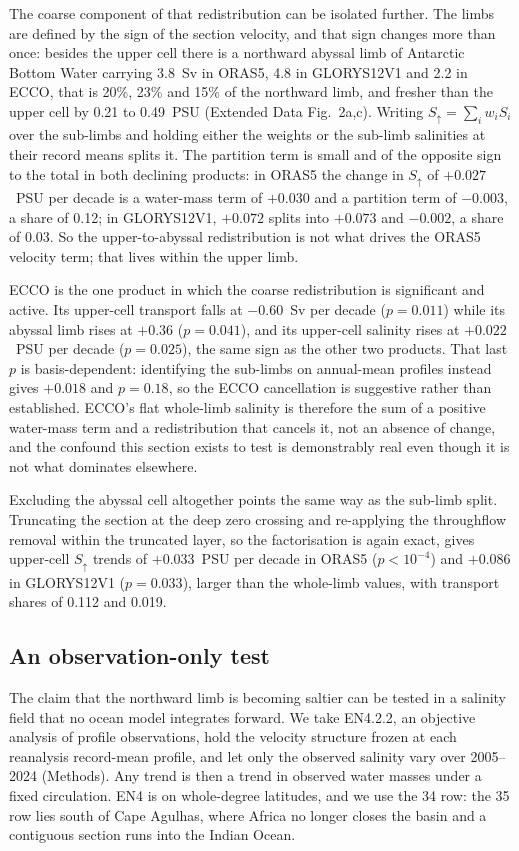 The coarse component of that redistribution can be isolated further. The limbs
are defined by the sign of the section velocity, and that sign changes more than
once: besides the upper cell there is a northward abyssal limb of Antarctic
Bottom Water carrying 3.8~Sv in ORAS5, 4.8 in GLORYS12V1 and 2.2 in ECCO, that
is 20\%, 23\% and 15\% of the northward limb, and fresher than the upper cell by 0.21 to
0.49~PSU (Extended Data Fig.~2a,c). Writing $S_{\uparrow}=\sum_i w_i S_i$ over
the sub-limbs and holding either the weights or the sub-limb salinities at their
record means splits it. The partition term is small and of the opposite sign to
the total in both declining products: in ORAS5 the change in $S_{\uparrow}$ of
$+0.027$~PSU per decade is a water-mass term of $+0.030$ and a partition term of
$-0.003$, a share of 0.12; in GLORYS12V1, $+0.072$ splits into $+0.073$ and
$-0.002$, a share of 0.03. So the upper-to-abyssal redistribution is not what
drives the ORAS5 velocity term; that lives within the upper limb.

ECCO is the one product in which the coarse redistribution is significant and
active. Its upper-cell transport falls at $-0.60$~Sv per decade ($p=0.011$)
while its abyssal limb rises at $+0.36$ ($p=0.041$), and its upper-cell salinity
rises at $+0.022$~PSU per decade ($p=0.025$), the same sign as the other two
products. That last $p$ is basis-dependent: identifying the sub-limbs on
annual-mean profiles instead gives $+0.018$ and $p=0.18$, so the ECCO
cancellation is suggestive rather than established.
ECCO's flat whole-limb salinity is therefore the sum of a positive water-mass
term and a redistribution that cancels it, not an absence of change, and the
confound this section exists to test is demonstrably real even though it is not
what dominates elsewhere.

Excluding the abyssal cell altogether points the same way as the sub-limb split.
Truncating the section at the deep zero crossing and re-applying the throughflow
removal within the truncated layer, so the factorisation is again exact, gives
upper-cell $S_{\uparrow}$ trends of $+0.033$~PSU per decade in ORAS5
($p<10^{-4}$) and $+0.086$ in GLORYS12V1 ($p=0.033$), larger than the whole-limb
values, with transport shares of 0.112 and 0.019.

\subsection*{An observation-only test}

The claim that the northward limb is becoming saltier can be tested in a
salinity field that no ocean model integrates forward. We take EN4.2.2, an
objective analysis of profile observations, hold the velocity structure frozen
at each reanalysis record-mean profile, and let only the observed salinity vary
over 2005--2024 (Methods). Any trend is then a trend in observed water masses
under a fixed circulation. EN4 is on whole-degree latitudes, and we use the
34\degS{} row: the 35\degS{} row lies south of Cape Agulhas, where Africa no
longer closes the basin and a contiguous section runs into the Indian Ocean.

